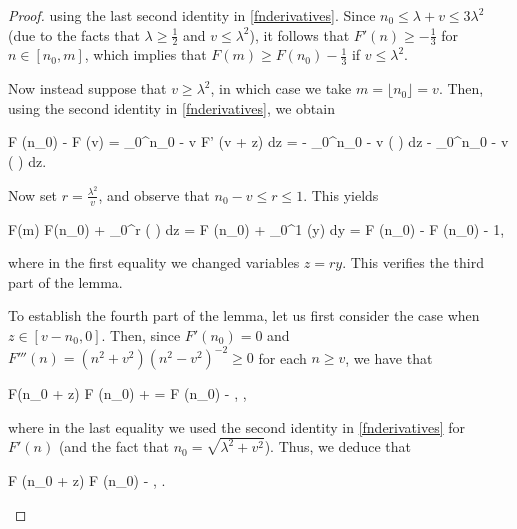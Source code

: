 \begin{proof}
	\noindent using the last second identity in \eqref{fnderivatives}. Since $n_0 \le \lambda + v \le 3 \lambda^2$ (due to the facts that $\lambda \ge \frac{1}{2}$ and $v \le \lambda^2$), it follows that $F' (n) \ge -\frac{1}{3}$ for $n \in [n_0, m]$, which implies that $F (m) \ge F(n_0) - \frac{1}{3}$ if $v \le \lambda^2$. 
	
	Now instead suppose that $v \ge \lambda^2$, in which case we take $m = \lfloor n_0 \rfloor = v$. Then, using the second identity in \eqref{fnderivatives}, we obtain
	\begin{flalign*}
	F (n_0) - F (v) = \displaystyle\int_0^{n_0 - v} F' (v + z) dz = - \displaystyle{} \displaystyle\int_0^{n_0 - v} \log \bigg( \displaystyle{} \bigg) dz \le  - \displaystyle{} \displaystyle\int_0^{n_0 - v} \log \bigg( \displaystyle{} \bigg) dz.
	\end{flalign*}
	
	\noindent Now set $r = \frac{\lambda^2}{v}$, and observe that $n_0 - v \le r \le 1$. This yields 
	\begin{flalign*}
	F(m) \ge F(n_0) + \displaystyle{} \displaystyle\int_0^r \log \bigg( \displaystyle{} \bigg) dz = F (n_0) +  \displaystyle{} \displaystyle\int_0^1 (\log y) dy = F (n_0) - \displaystyle{} \ge F (n_0) - 1,
	\end{flalign*} 
	
	\noindent where in the first equality we changed variables $z = ry$. This verifies the third part of the lemma. 
	
	To establish the fourth part of the lemma, let us first consider the case when $z \in [v - n_0, 0]$. Then, since $F' (n_0) = 0$ and $F''' (n) = (n^2 + v^2) (n^2 - v^2)^{-2} \ge 0$ for each $n \ge v$, we have that 
	\begin{flalign*}
	F(n_0 + z) \le F (n_0) + \displaystyle{} = F (n_0) - \displaystyle{}, \quad \text{for $z \in [v - n_0, 0]$},
	\end{flalign*} 
	
	\noindent where in the last equality we used the second identity in \eqref{fnderivatives} for $F' (n)$ (and the fact that $n_0 = \sqrt{\lambda^2 + v^2}$). Thus, we deduce that
	\begin{flalign}
	\label{fn0zn01}
	F (n_0 + z) \le F (n_0) - \displaystyle{}, \quad {}.
	\end{flalign}
	

\end{proof}
